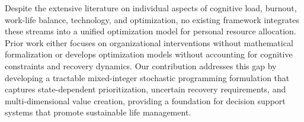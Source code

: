 Despite the extensive literature on individual aspects of cognitive load, burnout, work-life balance, technology, and optimization, no existing framework integrates these streams into a unified optimization model for personal resource allocation. Prior work either focuses on organizational interventions without mathematical formalization or develops optimization models without accounting for cognitive constraints and recovery dynamics. Our contribution addresses this gap by developing a tractable mixed-integer stochastic programming formulation that captures state-dependent prioritization, uncertain recovery requirements, and multi-dimensional value creation, providing a foundation for decision support systems that promote sustainable life management.

